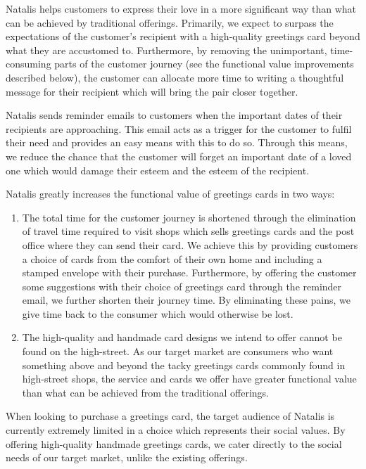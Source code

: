 \documentclass[10pt,a4paper]{article}
\begin{document}
Natalis helps customers to express their love in a more significant way than what can be achieved by traditional offerings. Primarily, we expect to surpass the expectations of the customer's recipient with a high-quality greetings card beyond what they are accustomed to. Furthermore, by removing the unimportant, time-consuming parts of the customer journey (see the functional value improvements described below), the customer can allocate more time to writing a thoughtful message for their recipient which will bring the pair closer together.

Natalis sends reminder emails to customers when the important dates of their recipients are approaching. This email acts as a trigger for the customer to fulfil their need and provides an easy means with this to do so. Through this means, we reduce the chance that the customer will forget an important date of a loved one which would damage their esteem and the esteem of the recipient.

Natalis greatly increases the functional value of greetings cards in two ways:
\begin{enumerate}
	\item The total time for the customer journey is shortened through the elimination of travel time required to visit shops which sells greetings cards and the post office where they can send their card. We achieve this by providing customers a choice of cards from the comfort of their own home and including a stamped envelope with their purchase. Furthermore, by offering the customer some suggestions with their choice of greetings card through the reminder email, we further shorten their journey time. By eliminating these pains, we give time back to the consumer which would otherwise be lost.
	\item The high-quality and handmade card designs we intend to offer cannot be found on the high-street. As our target market are consumers who want something above and beyond the tacky greetings cards commonly found in high-street shops, the service and cards we offer have greater functional value than what can be achieved from the traditional offerings.
\end{enumerate}

When looking to purchase a greetings card, the target audience of Natalis is currently extremely limited in a choice which represents their social values. By offering high-quality handmade greetings cards, we cater directly to the social needs of our target market, unlike the existing offerings.
\end{document}
